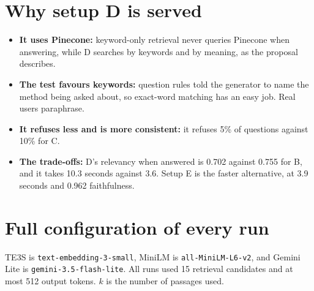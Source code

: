 \documentclass[10pt,a4paper,landscape]{article}
\begin{document}
\section{Why setup D is served}

\begin{itemize}\setlength{\itemsep}{1pt}
\item \textbf{It uses Pinecone:} keyword-only retrieval never queries Pinecone when answering, while D searches by keywords and by meaning, as the proposal describes.
\item \textbf{The test favours keywords:} question rules told the generator to name the method being asked about, so exact-word matching has an easy job. Real users paraphrase.
\item \textbf{It refuses less and is more consistent:} it refuses 5\% of questions against 10\% for C.
\item \textbf{The trade-offs:} D's relevancy when answered is 0.702 against 0.755 for B, and it takes 10.3 seconds against 3.6. Setup E is the faster alternative, at 3.9 seconds and 0.962 faithfulness.
\end{itemize}


\clearpage

\section{Full configuration of every run}

TE3S is \texttt{text-embedding-3-small}, MiniLM is \texttt{all-MiniLM-L6-v2}, and Gemini Lite is \texttt{gemini-3.5-flash-lite}. All runs used 15 retrieval candidates and at most 512 output tokens. $k$ is the number of passages used.
\end{document}
